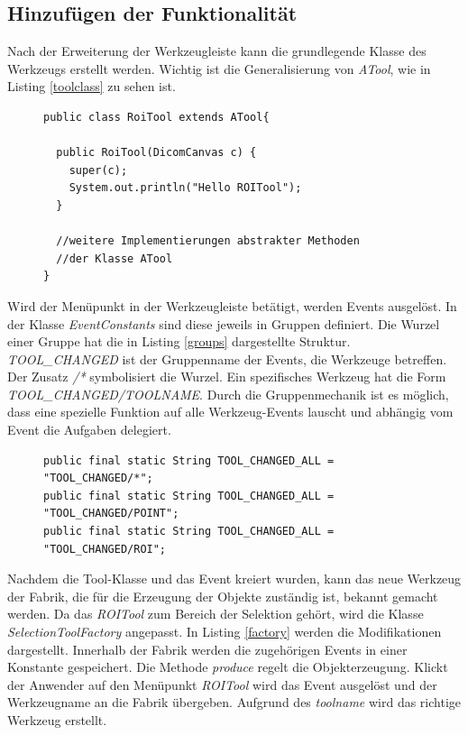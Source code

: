 \subsection{Hinzufügen der Funktionalität}

Nach der Erweiterung der Werkzeugleiste kann die grundlegende Klasse des Werkzeugs erstellt werden. Wichtig ist die Generalisierung von \textit{ATool}, wie in Listing \ref{toolclass} zu sehen ist.

\begin{figure}[htbp]
\begin{lstlisting}[frame=leftline]
public class RoiTool extends ATool{

  public RoiTool(DicomCanvas c) {
    super(c);
    System.out.println("Hello ROITool");
  }
  
  //weitere Implementierungen abstrakter Methoden
  //der Klasse ATool
}
\end{lstlisting}
\end{figure}

Wird der Menüpunkt in der Werkzeugleiste betätigt, werden Events ausgelöst. In der Klasse \textit{EventConstants} sind diese jeweils in Gruppen definiert. Die Wurzel einer Gruppe hat die in Listing \ref{groups} dargestellte Struktur. \textit{TOOL\_CHANGED} ist der Gruppenname der Events, die Werkzeuge betreffen. Der Zusatz \textit{/*} symbolisiert die Wurzel. Ein spezifisches Werkzeug hat die Form \textit{TOOL\_CHANGED/TOOLNAME}. Durch die Gruppenmechanik ist es möglich, dass eine spezielle Funktion auf alle Werkzeug-Events lauscht und abhängig vom Event die Aufgaben delegiert.

\begin{figure}[htbp]
\begin{lstlisting}[frame=leftline]
public final static String TOOL_CHANGED_ALL = "TOOL_CHANGED/*";
public final static String TOOL_CHANGED_ALL = "TOOL_CHANGED/POINT";
public final static String TOOL_CHANGED_ALL = "TOOL_CHANGED/ROI";
\end{lstlisting}
\end{figure}

Nachdem die Tool-Klasse und das Event kreiert wurden, kann das neue Werkzeug der Fabrik, die für die Erzeugung der Objekte zuständig ist, bekannt gemacht werden. Da das \textit{ROITool} zum Bereich der Selektion gehört, wird die Klasse \textit{SelectionToolFactory} angepasst. In Listing \ref{factory} werden die Modifikationen dargestellt. Innerhalb der Fabrik werden die zugehörigen Events in einer Konstante gespeichert. Die Methode \textit{produce} regelt die Objekterzeugung. Klickt der Anwender auf den Menüpunkt \textit{ROITool} wird das Event ausgelöst und der Werkzeugname an die Fabrik übergeben. Aufgrund des \textit{toolname} wird das richtige Werkzeug erstellt.

